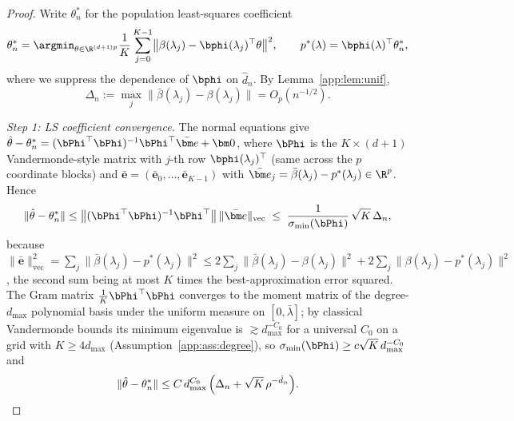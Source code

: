 \begin{proof}
Write $\theta^*_n$ for the population least-squares coefficient
\[
  \theta^*_n=\argmin_{\theta\in\R^{(d+1)p}}
  \frac1K\sum_{j=0}^{K-1}
  \bigl\|\beta(\lambda_j)-\bphi(\lambda_j)^\top\theta\bigr\|^2,
  \qquad p^*(\lambda)=\bphi(\lambda)^\top\theta^*_n,
\]
where we suppress the dependence of $\bphi$ on $\hat d_n$. By
Lemma~\ref{app:lem:unif},
\begin{equation}\label{app:eq:unifbar}
  \Delta_n:=\max_{j}\|\bar\beta(\lambda_j)-\beta(\lambda_j)\|
  =O_p(n^{-1/2}).
\end{equation}

\emph{Step 1: LS coefficient convergence.} The normal equations give
$\hat\theta-\theta^*_n=(\bPhi^\top\bPhi)^{-1}\bPhi^\top
\bar{\bm e}+\bm 0$, where $\bPhi$ is the $K\times(d+1)$ Vandermonde-style
matrix with $j$-th row $\bphi(\lambda_j)^\top$ (same across the $p$
coordinate blocks) and
$\bar{\bm e}=(\bar{\bm e}_0,\dots,\bar{\bm e}_{K-1})$ with
$\bar{\bm e}_j=\bar\beta(\lambda_j)-p^*(\lambda_j)\in\R^p$. Hence
\[
  \|\hat\theta-\theta^*_n\|
  \le\bigl\|(\bPhi^\top\bPhi)^{-1}\bPhi^\top\bigr\|\,
    \|\bar{\bm e}\|_{\mathrm{vec}}
  \;\le\;\frac{1}{\sigma_{\min}(\bPhi)}\,
    \sqrt{K}\,\Delta_n ,
\]
because $\|\bar{\bm e}\|_{\mathrm{vec}}^2=\sum_j\|\bar\beta(\lambda_j)
-p^*(\lambda_j)\|^2\le 2\sum_j\|\bar\beta(\lambda_j)-\beta(\lambda_j)\|^2
+2\sum_j\|\beta(\lambda_j)-p^*(\lambda_j)\|^2$, the second sum being at
most $K$ times the best-approximation error squared. The Gram matrix
$\frac1K\bPhi^\top\bPhi$ converges to the moment matrix of the
degree-$d_{\max}$ polynomial basis under the uniform measure on
$[0,\bar\lambda]$; by classical Vandermonde bounds its minimum eigenvalue
is $\gtrsim d_{\max}^{-C_0}$ for a universal $C_0$ on a grid with
$K\ge 4d_{\max}$ (Assumption~\ref{app:ass:degree}), so
$\sigma_{\min}(\bPhi)\ge c\sqrt{K}\,d_{\max}^{-C_0}$ and
\begin{equation}\label{app:eq:thetahat}
  \|\hat\theta-\theta^*_n\|
  \le C\,d_{\max}^{C_0}\,\Bigl(\Delta_n
     +\sqrt{K}\,\rho^{-\hat d_n}\Bigr).
\end{equation}


\end{proof}
